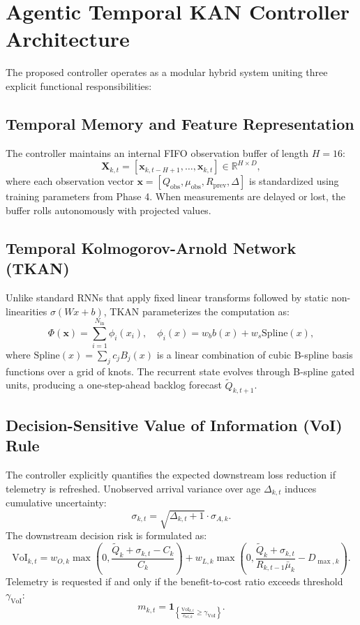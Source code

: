 \documentclass[conference]{IEEEtran}
\begin{document}
\section{Agentic Temporal KAN Controller Architecture}
The proposed controller operates as a modular hybrid system uniting three explicit functional responsibilities:

\subsection{Temporal Memory and Feature Representation}
The controller maintains an internal FIFO observation buffer of length $H=16$:
\begin{equation}
\mathbf{X}_{k, t} = \left[ \mathbf{x}_{k, t-H+1}, \dots, \mathbf{x}_{k, t} \right] \in \mathbb{R}^{H \times D},
\end{equation}
where each observation vector $\mathbf{x} = [Q_{\text{obs}}, \mu_{\text{obs}}, R_{\text{prev}}, \Delta]$ is standardized using training parameters from Phase 4. When measurements are delayed or lost, the buffer rolls autonomously with projected values.

\subsection{Temporal Kolmogorov-Arnold Network (TKAN)}
Unlike standard RNNs that apply fixed linear transforms followed by static non-linearities $\sigma(W x + b)$, TKAN parameterizes the computation as:
\begin{equation}
\Phi(\mathbf{x}) = \sum_{i=1}^{N_{\text{in}}} \phi_i(x_i), \quad \phi_i(x) = w_b b(x) + w_s \text{Spline}(x),
\end{equation}
where $\text{Spline}(x) = \sum_{j} c_j B_j(x)$ is a linear combination of cubic B-spline basis functions over a grid of knots. The recurrent state evolves through B-spline gated units, producing a one-step-ahead backlog forecast $\tilde{Q}_{k, t+1}$.

\subsection{Decision-Sensitive Value of Information (VoI) Rule}
The controller explicitly quantifies the expected downstream loss reduction if telemetry is refreshed. Unobserved arrival variance over age $\Delta_{k, t}$ induces cumulative uncertainty:
\begin{equation}
\sigma_{k, t} = \sqrt{\Delta_{k, t} + 1} \cdot \sigma_{A, k}.
\end{equation}
The downstream decision risk is formulated as:
\begin{equation}
\text{VoI}_{k, t} = w_{O, k} \max\left(0, \frac{\tilde{Q}_k + \sigma_{k, t} - C_k}{C_k}\right) + w_{L, k} \max\left(0, \frac{\tilde{Q}_k + \sigma_{k, t}}{R_{k, t-1} \bar{\mu}_k} - D_{\max, k}\right).
\end{equation}
Telemetry is requested if and only if the benefit-to-cost ratio exceeds threshold $\gamma_{\text{VoI}}$:
\begin{equation}
m_{k, t} = \mathbf{1}_{\left\{ \frac{\text{VoI}_{k, t}}{c_{\text{tel}, k}} \ge \gamma_{\text{VoI}} \right\}}.
\end{equation}
\end{document}
